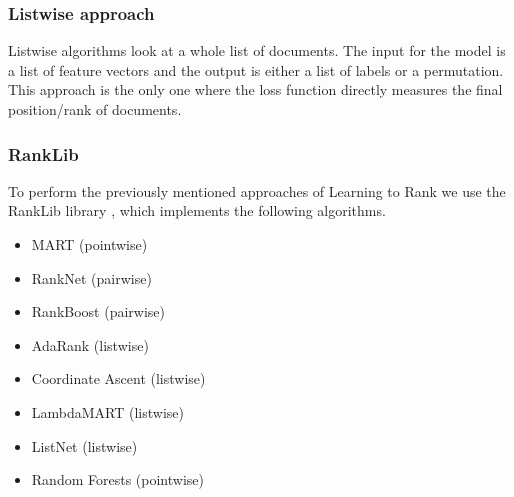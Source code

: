 \subsubsection{Listwise approach}
Listwise algorithms look at a whole list of documents. The input for the model is a list of feature vectors and the output is either a list of labels or a permutation. This approach is the only one where the loss function directly measures the final position/rank of documents.

\subsubsection{RankLib}
\label{sec:ranklib}
To perform the previously mentioned approaches of Learning to Rank we use the RankLib library \cite{ranklib}, which implements the following algorithms.
\begin{itemize}
\item MART \cite{MART} (pointwise)
\item RankNet \cite{RankNet} (pairwise)
\item RankBoost \cite{RankBoost} (pairwise)
\item AdaRank \cite{AdaRank} (listwise)
\item Coordinate Ascent \cite{CoordinateAscent} (listwise)
\item LambdaMART \cite{LambdaMART} (listwise)
\item ListNet \cite{ListNet} (listwise)
\item Random Forests \cite{RandomForests} (pointwise)
\end{itemize}